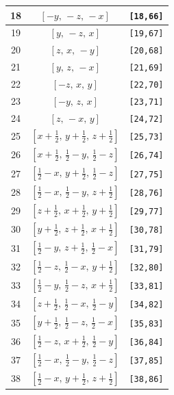 \documentclass[fleqn,8pt]{jsarticle}
\begin{document}
\begin{longtable}{ccc}
18 & $\left[ - y,\, - z,\, - x \right]$ & {\tt [18,66]} \\ \hline
19 & $\left[ y,\, - z,\, x \right]$ & {\tt [19,67]} \\ \hline
20 & $\left[ z,\, x,\, - y \right]$ & {\tt [20,68]} \\ \hline
21 & $\left[ y,\, z,\, - x \right]$ & {\tt [21,69]} \\ \hline
22 & $\left[ - z,\, x,\, y \right]$ & {\tt [22,70]} \\ \hline
23 & $\left[ - y,\, z,\, x \right]$ & {\tt [23,71]} \\ \hline
24 & $\left[ z,\, - x,\, y \right]$ & {\tt [24,72]} \\ \hline
25 & $\left[ x + \frac{1}{2},\, y + \frac{1}{2},\, z + \frac{1}{2} \right]$ & {\tt [25,73]} \\ \hline
26 & $\left[ x + \frac{1}{2},\, \frac{1}{2} - y,\, \frac{1}{2} - z \right]$ & {\tt [26,74]} \\ \hline
27 & $\left[ \frac{1}{2} - x,\, y + \frac{1}{2},\, \frac{1}{2} - z \right]$ & {\tt [27,75]} \\ \hline
28 & $\left[ \frac{1}{2} - x,\, \frac{1}{2} - y,\, z + \frac{1}{2} \right]$ & {\tt [28,76]} \\ \hline
29 & $\left[ z + \frac{1}{2},\, x + \frac{1}{2},\, y + \frac{1}{2} \right]$ & {\tt [29,77]} \\ \hline
30 & $\left[ y + \frac{1}{2},\, z + \frac{1}{2},\, x + \frac{1}{2} \right]$ & {\tt [30,78]} \\ \hline
31 & $\left[ \frac{1}{2} - y,\, z + \frac{1}{2},\, \frac{1}{2} - x \right]$ & {\tt [31,79]} \\ \hline
32 & $\left[ \frac{1}{2} - z,\, \frac{1}{2} - x,\, y + \frac{1}{2} \right]$ & {\tt [32,80]} \\ \hline
33 & $\left[ \frac{1}{2} - y,\, \frac{1}{2} - z,\, x + \frac{1}{2} \right]$ & {\tt [33,81]} \\ \hline
34 & $\left[ z + \frac{1}{2},\, \frac{1}{2} - x,\, \frac{1}{2} - y \right]$ & {\tt [34,82]} \\ \hline
35 & $\left[ y + \frac{1}{2},\, \frac{1}{2} - z,\, \frac{1}{2} - x \right]$ & {\tt [35,83]} \\ \hline
36 & $\left[ \frac{1}{2} - z,\, x + \frac{1}{2},\, \frac{1}{2} - y \right]$ & {\tt [36,84]} \\ \hline
37 & $\left[ \frac{1}{2} - x,\, \frac{1}{2} - y,\, \frac{1}{2} - z \right]$ & {\tt [37,85]} \\ \hline
38 & $\left[ \frac{1}{2} - x,\, y + \frac{1}{2},\, z + \frac{1}{2} \right]$ & {\tt [38,86]} \\ \hline

\end{longtable}
\end{document}
